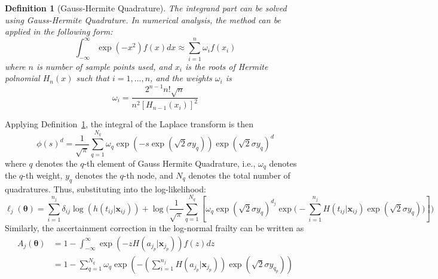 \documentclass[preprint,12pt]{elsarticle}
\newtheorem{defn}{Definition}
\begin{document}
\begin{defn}[Gauss-Hermite Quadrature]\label{defn:gausshermite}
    The integrand part can be solved using Gauss-Hermite Quadrature. In numerical analysis, the method can be applied in the following form:
\begin{equation}
    \int_{-\infty}^{\infty}\exp(-x^2)f(x)dx\approx \sum_{i=1}^n\omega_i f(x_i)
\end{equation}
where $n$ is number of sample points used, and $x_i$ is the roots of Hermite polnomial $H_n (x)$ such that $i=1, ..., n$, and the weights $\omega_i$ is 
\begin{equation}
    \omega_i=\frac{2^{n-1}n!\sqrt{n}}{n^2[H_{n-1}(x_i)]^2}
\end{equation}
\end{defn}

\noindent
Applying Definition~\ref{defn:gausshermite}, the integral of the Laplace transform is then
\begin{equation}
    \phi(s)^d=\frac{1}{\sqrt{\pi}}\sum_{q=1}^{N_{q}}\omega_{q}\exp(-s\exp(\sqrt{2}\sigma y_{q}))\exp(\sqrt{2}\sigma y_{q})^d
\end{equation}
where $q$ denotes the $q$-th element of Gauss Hermite Quadrature, i.e., $\omega_{q}$ denotes the $q$-th weight, $y_{q}$ denotes the $q$-th node, and $N_{q}$ denotes the total number of quadratures. Thus, substituting into the log-likelihood:
\begin{equation}
    \ell_j(\boldsymbol{\theta})=\sum_{i=1}^{n_j}\delta_{ij}\log(h(t_{ij}|\mathbf{x}_{ij}))+\log\Big (\frac{1}{\sqrt{\pi}}\sum_{q=1}^{N_{q}}\left [\omega_{q}\exp(\sqrt{2}\sigma y_{q})^{d_j}\exp\Big (-\sum_{i=1}^{n_j}H(t_{ij}|\mathbf{x}_{ij})\exp(\sqrt{2}\sigma y_{q})\Big )\right ]\Big )
\end{equation}
Similarly, the ascertainment correction in the log-normal frailty can be written as 
\begin{align}
    A_j(\boldsymbol{\theta})&=1-\int_{-\infty}^{\infty} \exp(-z H(a_{j_p}|\mathbf{x}_{j_p}))f(z)dz\\
    &=1-\sum_{q=1}^{N_{q}}\omega_{q} \exp\left (-(\sum_{i=1}^{n_j} H(a_{j_p}|\mathbf{x}_{j_p}))\exp (\sqrt{2}\sigma y_{q_p})\right )
\end{align}
\end{document}

